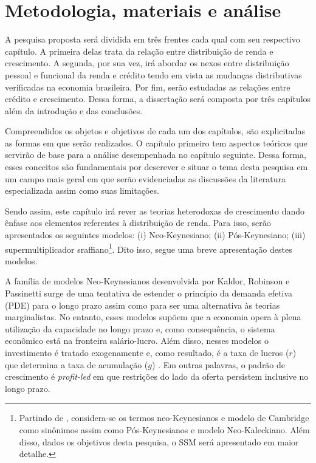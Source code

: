 \section{Metodologia, materiais e análise}\label{Metodo}

A pesquisa proposta será dividida em três frentes cada qual com seu respectivo capítulo.
A primeira delas trata da relação entre distribuição de renda e crescimento. A segunda, por sua vez, irá abordar os nexos entre distribuição pessoal e funcional da renda e crédito tendo em vista as mudanças distributivas verificadas na economia brasileira. Por fim, serão estudadas as relações entre crédito e crescimento. 
Dessa forma, a dissertação será composta por três capítulos além da introdução e das conclusões.  


Compreendidos os objetos e objetivos de cada um dos capítulos, são explicitadas as formas em que serão realizados. O capítulo primeiro tem aspectos teóricos que servirão de base para a análise desempenhada no capítulo seguinte.
Dessa forma, esses conceitos são fundamentais por descrever e situar o tema desta pesquisa em um campo mais geral em que serão evidenciadas as discussões da literatura especializada assim como suas limitações. 

Sendo assim, este capítulo irá rever as teorias heterodoxas de crescimento dando ênfase aos elementos referentes à distribuição de renda. Para isso, serão apresentados os seguintes modelos: (i) Neo-Keynesiano; (ii) Pós-Keynesiano; (iii) supermultiplicador sraffiano\footnote{Partindo de \textcite[Capítulo 6]{lavoie_post-keynesian_2014}, considera-se os termos neo-Keynesianos e modelo de Cambridge como sinônimos assim como Pós-Keynesianos e modelo Neo-Kaleckiano. Além disso, dados os objetivos desta pesquisa, o SSM será apresentado em maior detalhe.}. Dito isso, segue uma breve apresentação destes modelos.


A família de modelos Neo-Keynesianos desenvolvida por Kaldor, Robinson e Passinetti surge de uma tentativa de estender o princípio da demanda efetiva (PDE) para o longo prazo assim como para ser uma alternativa às teorias marginalistas. No entanto, esses modelos supõem que a economia opera à plena utilização da capacidade no longo prazo e, como consequência, o sistema econômico está na fronteira salário-lucro. Além disso, nesses modelos o investimento é tratado exogenamente e, como resultado, é a taxa de lucros ($r$) que determina a taxa de acumulação ($g$) \cite[Capítulo 6]{lavoie_post-keynesian_2014}. Em outras palavras, o padrão de crescimento é \textit{profit-led} em que restrições do lado da oferta persistem inclusive no longo prazo.

